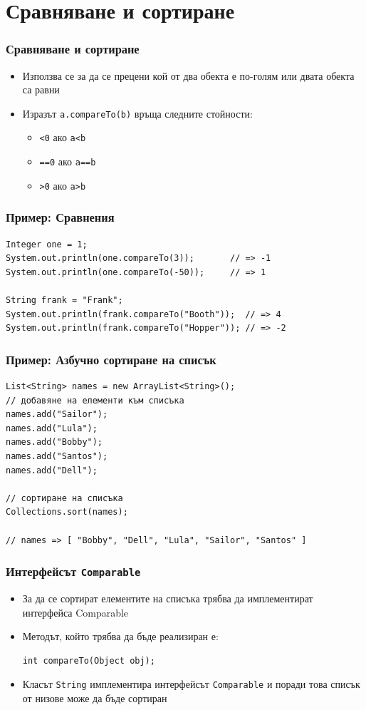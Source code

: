 \documentclass[ignorenonframetext, hyperref=unicode,compress]{beamer}
\begin{document}
\section{Сравняване и сортиране}

\begin{frame}[containsverbatim]\frametitle{Сравняване и сортиране}
\begin{itemize}
\item Използва се за да се прецени кой от два обекта е по-голям или двата обекта са равни
\item Изразът \lstinline{a.compareTo(b)} връща следните стойности:
\begin{itemize}
\item \lstinline{<0} ако \lstinline{a<b}
\item \lstinline{==0} ако \lstinline{a==b}
\item \lstinline{>0} ако \lstinline{a>b}
\end{itemize}
\end{itemize}
\end{frame}

\begin{frame}[containsverbatim]\frametitle{Пример: Сравнения}
\begin{lstlisting}
Integer one = 1;
System.out.println(one.compareTo(3)); 		// => -1
System.out.println(one.compareTo(-50)); 	// => 1

String frank = "Frank";
System.out.println(frank.compareTo("Booth"));  // => 4
System.out.println(frank.compareTo("Hopper")); // => -2
\end{lstlisting}
\end{frame}

\begin{frame}[containsverbatim]\frametitle{Пример: Азбучно сортиране на списък}
\begin{lstlisting}
List<String> names = new ArrayList<String>();
// добавяне на елементи към списъка
names.add("Sailor");
names.add("Lula");
names.add("Bobby");
names.add("Santos");
names.add("Dell");

// сортиране на списъка
Collections.sort(names);
	
// names => [ "Bobby", "Dell", "Lula", "Sailor", "Santos" ]
\end{lstlisting}
\end{frame}

\begin{frame}[containsverbatim]\frametitle{Интерфейсът \lstinline{Comparable}}
\begin{itemize}
\item За да се сортират елементите на списъка трябва да имплементират интерфейса Comparable
\item Методът, който трябва да бъде реализиран е:
\begin{lstlisting}
int compareTo(Object obj); 
\end{lstlisting}
\item Класът \lstinline{String} имплементира интерфейсът \lstinline{Comparable} и поради това списък от низове може да бъде сортиран
\end{itemize}
\end{frame}
\end{document}
